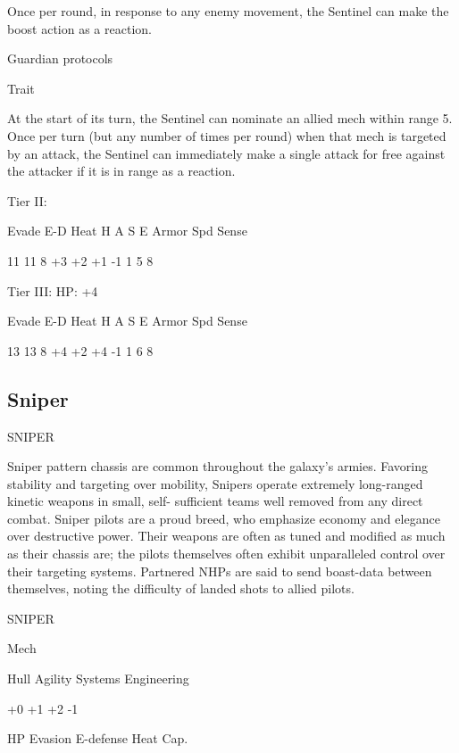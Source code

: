 Once per round, in response to any enemy movement, the Sentinel can make the boost action as  
a reaction.
 

Guardian protocols
 
Trait
 
At the start of its turn, the Sentinel can nominate an allied mech within range 5. Once per turn  
(but any number of times per round) when that mech is targeted by an attack, the Sentinel can  
immediately make a single attack for free against the attacker if it is in range as a reaction.
 

Tier II:
 

          Evade     E-D    Heat    H    A     S     E        Armor        Spd      Sense 

          11        11     8       +3    +2   +1    -1       1            5        8 

Tier III:  
HP: +4
 

          Evade     E-D    Heat    H    A     S     E        Armor        Spd      Sense 

          13        13     8       +4    +2   +4    -1       1            6        8 

                                                                                                                 
\subsection{Sniper}

                                                 SNIPER  

Sniper pattern chassis are common throughout the galaxy’s armies. Favoring stability and  
targeting over mobility, Snipers operate extremely long-ranged kinetic weapons in small, self- 
sufficient teams well removed from any direct combat. Sniper pilots are a proud breed, who  
emphasize economy and elegance over destructive power. Their weapons are often as tuned and  
modified as much as their chassis are; the pilots themselves often exhibit unparalleled control  
over their targeting systems. Partnered NHPs are said to send boast-data between themselves,  
noting the difficulty of landed shots to allied pilots. 
 

 SNIPER 

 Mech 

 Hull       Agility      Systems       Engineering 

 +0         +1           +2            -1 

 HP         Evasion      E-defense     Heat Cap. 

